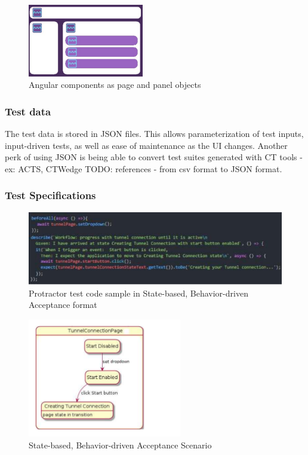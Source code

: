 \documentclass[conference]{IEEEtran}
\newcommand{\todo}[1]{}
\renewcommand{\todo}[1]{{\color{red} TODO: {#1}}}
\begin{document}
	\begin{figure}[!h]
		\includegraphics[width=0.45\textwidth,]{angular.pdf}
	\caption{Angular components as page and panel objects}
	\label{fig:angular}
	\end{figure}

	\subsubsection{Test data}
	The test data is stored in JSON files. This allows parameterization of test inputs, input-driven tests, as well as ease of maintenance as the UI changes.
	Another perk of using JSON is being able to convert test suites generated with CT tools - ex: ACTS, CTWedge \todo{references }- from csv format to JSON format.

	\subsubsection{Test Specifications}

	\begin{figure}[!ht]
		\centering
			\includegraphics[width=1.00\textwidth]{codeSample.pdf}
		\caption{Protractor test code sample in State-based, Behavior-driven Acceptance format}
		\label{fig:codeSample}
	\end{figure}	


	\begin{figure}[!h]
		\includegraphics[width=0.60\textwidth,]{stateBasedScenario.pdf}
		\caption{State-based, Behavior-driven Acceptance Scenario}
		\label{fig:stateBasedScenario}
	\end{figure}
\end{document}
